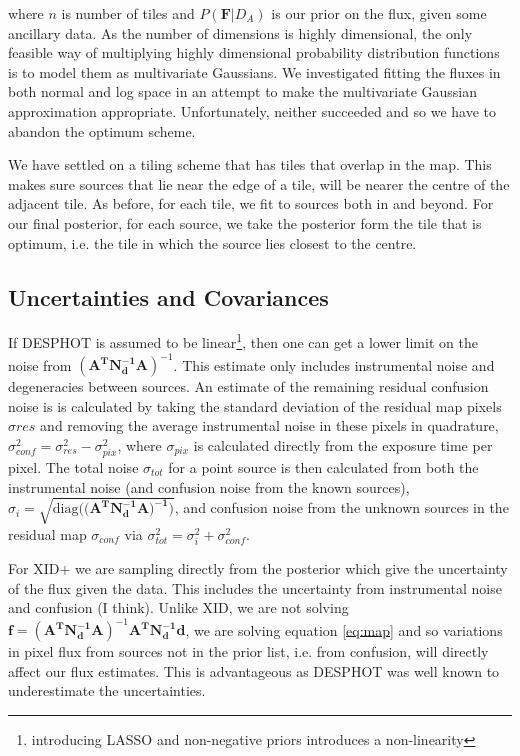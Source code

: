 \documentclass[useAMS,usenatbib]{mn2e}
\begin{document}
where $n$ is number of tiles and $P(\mathbf{F}|D_A)$ is our prior on the flux, given some ancillary data. As the number of dimensions is highly dimensional, the only feasible way of multiplying highly dimensional probability distribution functions is to model them as multivariate Gaussians. We investigated fitting the fluxes in both normal and log space in an attempt to make the multivariate Gaussian approximation appropriate. Unfortunately, neither succeeded and so we have to abandon the optimum scheme.

We have settled on a tiling scheme that has tiles that overlap in the map. This makes sure sources that lie near the edge of a tile, will be nearer the centre of the adjacent tile. As before, for each tile, we fit to sources both in and beyond. For our final posterior, for each source, we take the posterior form the tile that is optimum, i.e. the tile in which the source lies closest to the centre.

\subsection{Uncertainties and Covariances}
If DESPHOT is assumed to be linear\footnote{introducing LASSO and non-negative priors introduces a non-linearity}, then one can get a lower limit on the noise from $(\mathbf{A^TN_d^{-1}A})^{-1}$. This estimate only includes instrumental noise and degeneracies between sources. An estimate of the remaining residual confusion noise is is calculated by taking the standard deviation of the residual map pixels $\sigma{res}$ and removing the average instrumental noise in these pixels in quadrature, $\sigma^2_{conf} = \sigma^2_{res} - \sigma^2_{pix}$, where $\sigma_{pix}$ is calculated directly from the exposure time per pixel. The total noise $\sigma_{tot}$ for a point source is then calculated from both the instrumental noise (and confusion noise from the known sources), $\sigma_{i} = \sqrt{\mathrm{diag}((\mathbf{A^TN^{-1}_dA)^{-1})}}$, and confusion noise from the unknown sources in the residual map $\sigma_{conf}$ via $\sigma^2_{tot} = \sigma^2_{i} + \sigma^2_{conf}$. 

For XID+ we are sampling directly from the posterior which give the uncertainty of the flux given the data. This includes the uncertainty from instrumental noise and confusion (I think). Unlike XID, we are not solving $\mathbf{f}=(\mathbf{A^TN_d^{-1}A})^{-1}\mathbf{A^TN_d^{-1}d}$, we are solving equation \ref{eq:map} and so variations in pixel flux from sources not in the prior list, i.e. from confusion, will directly affect our flux estimates. This is advantageous as DESPHOT was well known to underestimate the uncertainties.
\end{document}
